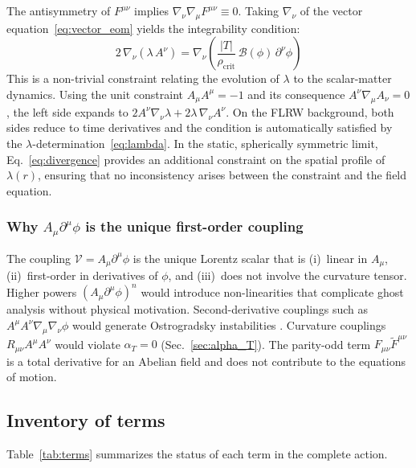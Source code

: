 \documentclass[aps,prd,twocolumn,superscriptaddress,nofootinbib]{revtex4-2}
\begin{document}
The antisymmetry of $F^{\mu\nu}$ implies $\nabla_\nu\nabla_\mu F^{\mu\nu} \equiv 0$. Taking $\nabla_\nu$ of the vector equation~\eqref{eq:vector_eom} yields the integrability condition:
\begin{equation}
2\,\nabla_\nu(\lambda\,A^\nu) = \nabla_\nu\!\left(\frac{|T|}{\rho_{\mathrm{crit}}}\,\mathcal{B}(\phi)\,\partial^\nu\phi\right)
\label{eq:divergence}
\end{equation}
This is a non-trivial constraint relating the evolution of $\lambda$ to the scalar-matter dynamics. Using the unit constraint $A_\mu A^\mu = -1$ and its consequence $A^\nu\nabla_\mu A_\nu = 0$, the left side expands to $2A^\nu\nabla_\nu\lambda + 2\lambda\,\nabla_\nu A^\nu$. On the FLRW background, both sides reduce to time derivatives and the condition is automatically satisfied by the $\lambda$-determination~\eqref{eq:lambda}. In the static, spherically symmetric limit, Eq.~\eqref{eq:divergence} provides an additional constraint on the spatial profile of $\lambda(r)$, ensuring that no inconsistency arises between the constraint and the field equation.

\subsubsection{Why $A_\mu\partial^\mu\phi$ is the unique first-order coupling}

The coupling $\mathcal{V} = A_\mu\partial^\mu\phi$ is the unique Lorentz scalar that is (i)~linear in $A_\mu$, (ii)~first-order in derivatives of $\phi$, and (iii)~does not involve the curvature tensor. Higher powers $(A_\mu\partial^\mu\phi)^n$ would introduce non-linearities that complicate ghost analysis without physical motivation. Second-derivative couplings such as $A^\mu A^\nu\nabla_\mu\nabla_\nu\phi$ would generate Ostrogradsky instabilities \cite{Woodard2015}. Curvature couplings $R_{\mu\nu}A^\mu A^\nu$ would violate $\alpha_T = 0$ (Sec.~\ref{sec:alpha_T}). The parity-odd term $F_{\mu\nu}\tilde{F}^{\mu\nu}$ is a total derivative for an Abelian field and does not contribute to the equations of motion.

\subsection{Inventory of terms}

Table~\ref{tab:terms} summarizes the status of each term in the complete action.
\end{document}
